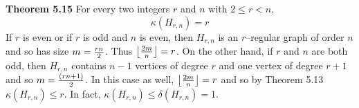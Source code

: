 \nopagenumbers
{\bf Theorem 5.15}
\vskip 6pt
For every two integers $r$ and $n$ with $2 \leq r < n$, $$ \kappa (H_{r,n})=r$$
\vskip 12pt
If $r$ is even or if $r$ is odd and $n$ is even, then $H_{r,n}$ is an $r$--regular graph of order $n$ and so has size $m= {rn \over 2}$. Thus $ \bigl\lfloor {2m \over n} \bigr\rfloor = r$. On the other hand, if $r$ and $n$ are both odd, then $H_{r,n}$ contains $n-1$ vertices of degree $r$ and one vertex of degree $r+1$ and so $m={(rn+1) \over 2}$. In this case as well, $ \bigl\lfloor {2m \over n} \bigr\rfloor = r$ and so by Theorem 5.13 $ \kappa (H_{r,n}) \leq r$. In fact, $\kappa (H_{r,n}) \leq \delta(H_{r,n})=1$.

\vfill\eject
